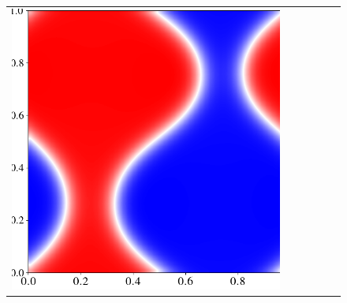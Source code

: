 \documentclass[12pt, reqno]{report}
\theoremstyle{definition}
\theoremstyle{remark}
\begin{document}
\begin{figure}[H]
\begin{tabular}{rccccc}
        \includegraphics[align = c, height=\subheight]{media_paper/end_CH_cmap_FD_n=1000.png} \\


\end{tabular}
\end{figure}
\end{document}
